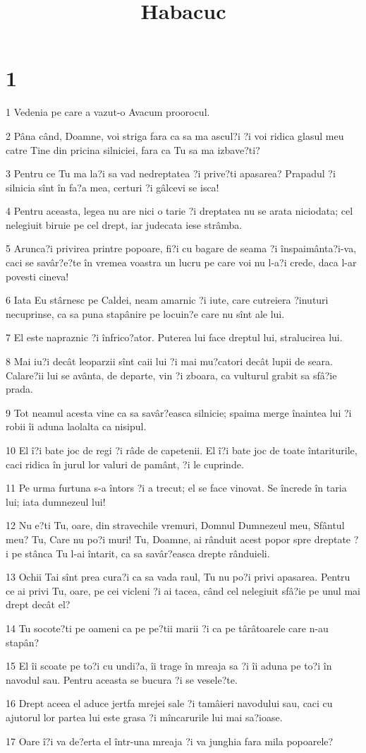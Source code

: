

\title{Habacuc}


\chapter{1}

\par 1 Vedenia pe care a vazut-o Avacum proorocul.
\par 2 Pâna când, Doamne, voi striga fara ca sa ma ascul?i ?i voi ridica glasul meu catre Tine din pricina silniciei, fara ca Tu sa ma izbave?ti?
\par 3 Pentru ce Tu ma la?i sa vad nedreptatea ?i prive?ti apasarea? Prapadul ?i silnicia sînt în fa?a mea, certuri ?i gâlcevi se isca!
\par 4 Pentru aceasta, legea nu are nici o tarie ?i dreptatea nu se arata niciodata; cel nelegiuit biruie pe cel drept, iar judecata iese strâmba.
\par 5 Arunca?i privirea printre popoare, fi?i cu bagare de seama ?i înspaimânta?i-va, caci se savâr?e?te în vremea voastra un lucru pe care voi nu l-a?i crede, daca l-ar povesti cineva!
\par 6 Iata Eu stârnesc pe Caldei, neam amarnic ?i iute, care cutreiera ?inuturi necuprinse, ca sa puna stapânire pe locuin?e care nu sînt ale lui.
\par 7 El este napraznic ?i înfrico?ator. Puterea lui face dreptul lui, stralucirea lui.
\par 8 Mai iu?i decât leoparzii sînt caii lui ?i mai mu?catori decât lupii de seara. Calare?ii lui se avânta, de departe, vin ?i zboara, ca vulturul grabit sa sfâ?ie prada.
\par 9 Tot neamul acesta vine ca sa savâr?easca silnicie; spaima merge înaintea lui ?i robii îi aduna laolalta ca nisipul.
\par 10 El î?i bate joc de regi ?i râde de capetenii. El î?i bate joc de toate întariturile, caci ridica în jurul lor valuri de pamânt, ?i le cuprinde.
\par 11 Pe urma furtuna s-a întors ?i a trecut; el se face vinovat. Se încrede în taria lui; iata dumnezeul lui!
\par 12 Nu e?ti Tu, oare, din stravechile vremuri, Domnul Dumnezeul meu, Sfântul meu? Tu, Care nu po?i muri! Tu, Doamne, ai rânduit acest popor spre dreptate ?i pe stânca Tu l-ai întarit, ca sa savâr?easca drepte rânduieli.
\par 13 Ochii Tai sînt prea cura?i ca sa vada raul, Tu nu po?i privi apasarea. Pentru ce ai privi Tu, oare, pe cei vicleni ?i ai tacea, când cel nelegiuit sfâ?ie pe unul mai drept decât el?
\par 14 Tu socote?ti pe oameni ca pe pe?tii marii ?i ca pe târâtoarele care n-au stapân?
\par 15 El îi scoate pe to?i cu undi?a, îi trage în mreaja sa ?i îi aduna pe to?i în navodul sau. Pentru aceasta se bucura ?i se vesele?te.
\par 16 Drept aceea el aduce jertfa mrejei sale ?i tamâieri navodului sau, caci cu ajutorul lor partea lui este grasa ?i mîncarurile lui mai sa?ioase.
\par 17 Oare î?i va de?erta el într-una mreaja ?i va junghia fara mila popoarele?

